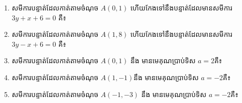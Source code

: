 \begin{enumerate}
\item សមីការបន្ទាត់ដែលកាត់តាមចំណុច $A(0,1)$ ហើយកែងទៅនឹងបន្ទាត់ដែលមានសមីការ $3y+x+6=0$ គឺ៖
\begin{enumerate}[label=\alph*.]
\end{enumerate}

\item សមីការបន្ទាត់ដែលកាត់តាមចំណុច $A(1,8)$ ហើយកែងទៅនឹងបន្ទាត់ដែលមានសមីការ $3y-x+6=0$ គឺ៖
\begin{enumerate}[label=\alph*.]
\end{enumerate}

\item សមីការបន្ទាត់ដែលកាត់តាមចំណុច $A(0,1)$ នឹង មានមេគុណប្រាប់ទិស $a=2$គឺ៖
\begin{enumerate}[label=\alph*.]
\end{enumerate}

\item សមីការបន្ទាត់ដែលកាត់តាមចំណុច $A(1,-1)$នឹង មានមេគុណប្រាប់ទិស $a=-2$គឺ៖
\begin{enumerate}[label=\alph*.]
\end{enumerate}

\item សមីការបន្ទាត់ដែលកាត់តាមចំណុច $A(-1,-3)$ នឹង មានមេគុណប្រាប់ទិស $a=-2$គឺ៖
\begin{enumerate}[label=\alph*.]
\end{enumerate}


\end{enumerate}
